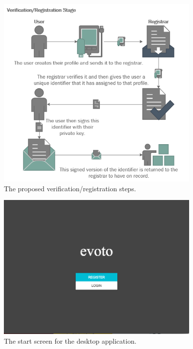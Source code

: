 \documentclass{article}
\begin{document}
\begin{centering}
    \begin{figure}[H]
        \centering
        \includegraphics[width=0.9\textwidth]{verification}
        \caption{The proposed verification/registration steps.}
        \label{fig:registration}
    \end{figure}

    \begin{figure}[H]
        \centering
        \includegraphics[width=0.9\textwidth]{screenshots/screen-start}
        \caption{The start screen for the desktop application.}
        \label{fig:registration}
    \end{figure}
    

\end{centering}
\end{document}
